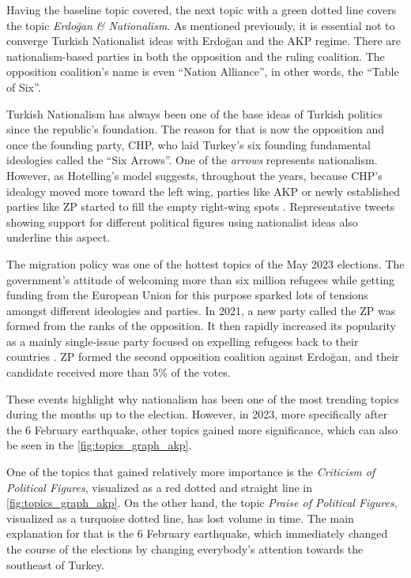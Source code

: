 Having the baseline topic covered, the next topic with a green dotted line covers the topic 
\textit{Erdoğan \& Nationalism}. As mentioned previously, it is essential not to converge Turkish 
Nationalist ideas with Erdoğan and the AKP regime. There are nationalism-based parties in both the 
opposition and the ruling coalition. The opposition coalition's name is even ``Nation Alliance'', 
in other words, the ``Table of Six''.

Turkish Nationalism has always been one of the base ideas of Turkish politics since the republic's 
foundation. The reason for that is now the opposition and once the founding party, \ac{CHP}, who laid 
Turkey's six founding fundamental ideologies called the ``Six Arrows''. 
One of the \textit{arrows} represents nationalism. However, as Hotelling's model suggests, 
throughout the years, because CHP's idealogy moved more toward the left wing, parties like AKP or 
newly established parties like \ac{ZP} started to fill the empty right-wing spots \parencite{caramani_comparative_politics_2020}. 
Representative tweets showing support for different political figures using nationalist 
ideas also underline this aspect. 

The migration policy was one of the hottest topics of the May 2023 elections. 
The government's attitude of welcoming more than six million refugees while getting funding from the 
European Union for this purpose sparked lots of tensions amongst different ideologies and parties. 
In 2021, a new party called the \ac{ZP} was formed from the ranks of the opposition. 
It then rapidly increased its popularity as a mainly single-issue party focused on expelling refugees 
back to their countries \parencite{berk_esen_turkish_politics_2023}. \ac{ZP} formed the second opposition 
coalition against Erdoğan, and their candidate received more than 5\% of the votes. 

These events highlight why nationalism has been one of the most trending topics during the months up 
to the election. However, in 2023, more specifically after the 6 February earthquake, other 
topics gained more significance, which can also be seen in the \autoref{fig:topics_graph_akp}.

One of the topics that gained relatively more importance is the \textit{Criticism of Political Figures}, 
visualized as a red dotted and straight line in \autoref{fig:topics_graph_akp}. On the other hand, 
the topic \textit{Praise of Political Figures}, visualized as a turquoise dotted line, has lost volume 
in time. The main explanation for that is the 6 February earthquake, which immediately changed 
the course of the elections by changing everybody's attention towards the southeast of Turkey. 


